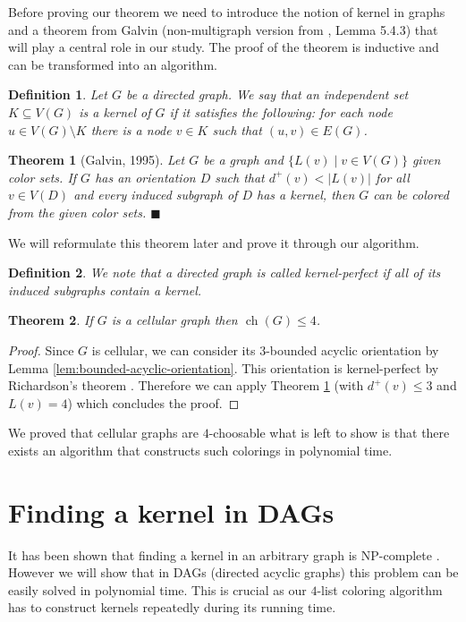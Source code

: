 \documentclass[letterpaper, 10 pt, conference]{ieeeconf}  %
\newtheorem{thm}{Theorem}
\newtheorem{defi}{Definition}
\DeclareMathOperator*{\ch}{ch}
\begin{document}
Before proving our theorem we need to introduce the notion of kernel in graphs and a theorem from Galvin \cite{Galvin:1995:LCI:199352.199369} (non-multigraph version from \cite{citeulike:395714}, Lemma 5.4.3) that will play a central role in our study. The proof of the theorem is inductive and can be transformed into an algorithm.
\begin{defi} Let $G$ be a directed graph. We say that an independent set $K \subseteq V(G)$ is a kernel of $G$ if it satisfies the following: for each node $u \in V(G) \setminus K$ there is a node $v \in K$ such that $(u,v) \in E(G)$.
\end{defi}
\begin{thm}[Galvin, 1995]\label{thm:galvin} Let $G$ be a graph and $\lbrace L(v) \mid v \in V(G) \rbrace$ given color sets. If $G$ has an orientation $D$ such that $d^+(v) < |L(v)|$ for all $v \in V(D)$ and every induced subgraph of $D$ has a kernel, then $G$ can be colored from the given color sets. $\blacksquare$
\end{thm}
We will reformulate this theorem later and prove it through our algorithm. 
\begin{defi} We note that a directed graph is called kernel-perfect if all of its induced subgraphs contain a kernel.
\end{defi}
\begin{thm}\label{thm:choice-number}
If $G$ is a cellular graph then $\ch(G) \leqslant 4$.
\end{thm}
\begin{proof}
Since $G$ is cellular, we can consider its $3$-bounded acyclic orientation by Lemma \ref{lem:bounded-acyclic-orientation}. This orientation is kernel-perfect by Richardson's theorem \cite{richardson1946}. Therefore we can apply Theorem \ref{thm:galvin} (with $d^+(v) \leqslant 3$ and $L(v)=4$) which concludes the proof.
\end{proof}

We proved that cellular graphs are $4$-choosable what is left to show is that there exists an algorithm that constructs such colorings in polynomial time.
\section{Finding a kernel in DAGs}

It has been shown that finding a kernel in an arbitrary graph is $\mathrm{NP}$-complete \cite{chvatal}. However we will show that in DAGs (directed acyclic graphs) this problem can be easily solved in polynomial time. This is crucial as our $4$-list coloring algorithm has to construct kernels repeatedly during its running time.
\end{document}
